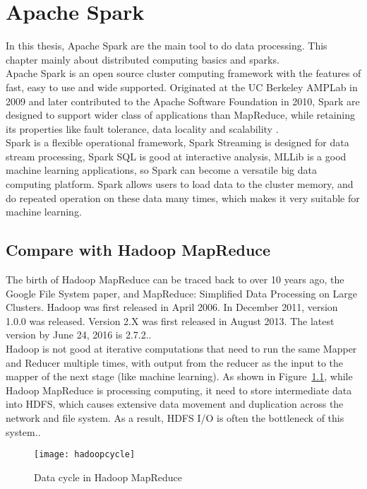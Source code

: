 \chapter{Apache Spark}

In this thesis, Apache Spark are the main tool to do data processing. This chapter mainly about distributed computing basics and sparks.\\

Apache Spark is an open source cluster computing framework with the features of fast, easy to use and wide supported. Originated at the UC Berkeley AMPLab in 2009 and later contributed to the Apache Software Foundation in 2010, Spark are designed to support wider class of applications than MapReduce, while retaining its properties like fault tolerance, data locality and scalability \cite{1_ryza_laserson_owen_wills}.\\


Spark is a flexible operational framework, Spark Streaming is designed for data stream processing, Spark SQL is good at interactive analysis, MLLib is a good machine learning applications, so Spark can become a versatile big data computing platform\cite{apache_spark}. Spark allows users to load data to the cluster memory, and do repeated operation on these data many times, which makes it very suitable for machine learning.

\section{Compare with Hadoop MapReduce}

The birth of Hadoop MapReduce can be traced back to over 10 years ago, the Google File System paper\cite{ghemawat2003google}, and MapReduce: Simplified Data Processing on Large Clusters\cite{dean2008mapreduce}. Hadoop was first released in April 2006. In December 2011, version 1.0.0 was released. Version 2.X was first released in August 2013. The latest version by June 24, 2016 is 2.7.2.\cite{2_wadkarsiddalingaiah}.\\


Hadoop is not good at iterative computations that need to run the same Mapper and Reducer multiple times, with output from the reducer as the input to the mapper of the next stage (like machine learning). As shown in Figure~\ref{fg:hadoop}, while Hadoop MapReduce is processing computing, it need to store intermediate data into HDFS, which causes extensive data movement and duplication across the network and file system. As a result, HDFS I/O is often the bottleneck of this system.\cite{2_wadkarsiddalingaiah}.
\begin{figure}[h]
	\centering
	\texttt{[image: hadoopcycle]}
	\caption{Data cycle in Hadoop MapReduce}
	\label{fg:hadoop}
\end{figure}


